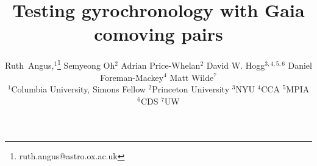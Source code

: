 \documentclass[useAMS, usenatbib]{mn2e}
\newcommand{\columbia}{1}
\newcommand{\simons}{2}
\newcommand{\pton}{3}
\newcommand{\nyu}{3}
\newcommand{\cca}{4}
\newcommand{\mpia}{5}
\newcommand{\cds}{6}
\newcommand{\uw}{7}
\begin{document}
\title{Testing gyrochronology with Gaia comoving pairs}

\author[R.~Angus \emph{et al.}]{%
    Ruth~Angus,$^1$\thanks{ruth.angus@astro.ox.ac.uk}
    Semyeong Oh$^2$
    Adrian Price-Whelan$^2$
    David W. Hogg$^{3, 4, 5, 6}$
    Daniel Foreman-Mackey$^4$
    Matt Wilde$^7$ \\
    $^1$Columbia University, Simons Fellow
    $^2$Princeton University
    $^3$NYU
    $^4$CCA
    $^5$MPIA
    $^6$CDS
    $^7$UW}


\end{document}
